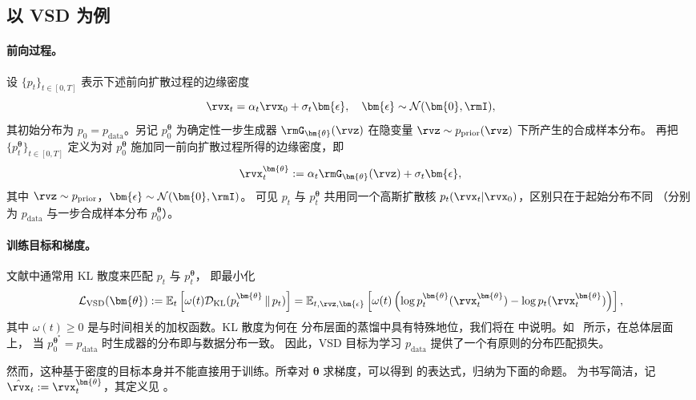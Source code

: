 \subsection{以 VSD 为例}
\paragraph{前向过程。}
设 $\{p_t\}_{t \in [0,T]}$ 表示下述前向扩散过程的边缘密度
\[
\rvx_t = \alpha_t \rvx_0 + \sigma_t \bm{\epsilon}, \quad \bm{\epsilon} \sim \mathcal{N}(\bm{0}, \rmI),
\]
其初始分布为 $p_0 = p_{\mathrm{data}}$。另记 $p_0^{\bm{\theta}}$ 为确定性一步生成器 $\rmG_{\bm{\theta}}(\rvz)$ 在隐变量
$\rvz \sim p_{\mathrm{prior}}(\rvz)$ 下所产生的合成样本分布。
再把 $\{p_t^{\bm{\theta}}\}_{t \in [0,T]}$ 定义为对 $p_0^{\bm{\theta}}$
施加同一前向扩散过程所得的边缘密度，即
\begin{align}\label{eq:vsd-forward}
    \rvx_t^{\bm{\theta}} := \alpha_t \rmG_{\bm{\theta}}(\rvz) + \sigma_t \bm{\epsilon},
\end{align}
其中 $\rvz \sim p_{\mathrm{prior}}$，$\bm{\epsilon} \sim \mathcal{N}(\bm{0}, \rmI)$。
可见 $p_t$ 与 $p_t^{\bm{\theta}}$ 共用同一个高斯扩散核
$p_t(\rvx_t| \rvx_0)$，区别只在于起始分布不同
（分别为 $p_{\mathrm{data}}$ 与一步合成样本分布 $p_0^{\bm{\theta}}$）。

\paragraph{训练目标和梯度。}
文献中通常用 KL 散度来匹配 $p_t$ 与 $p_t^{\bm{\theta}}$，
即最小化
\begin{align*}
    \mathcal{L}_{\text{VSD}}(\bm{\theta}) :=\mathbb{E}_t \left[ \omega(t)  \mathcal{D}_{\text{KL}}(p_t^{\bm{\theta}} \, \| \, p_t) \right]
= \mathbb{E}_{t, \rvz, \bm{\epsilon}} \left[ \omega(t) \left( \log p_t^{\bm{\theta}}(\rvx_t^{\bm{\theta}}) - \log p_t(\rvx_t^{\bm{\theta}}) \right) \right],
\end{align*}
其中 $\omega(t)\geq 0$ 是与时间相关的加权函数。KL 散度为何在
分布层面的蒸馏中具有特殊地位，我们将在 
中说明。如~\citet{wang2023prolificdreamer} 所示，在总体层面上，
当 $p_0^{\bm{\theta}^*}=p_{\mathrm{data}}$ 时生成器的分布即与数据分布一致。
因此，VSD 目标为学习 $p_{\mathrm{data}}$ 提供了一个有原则的分布匹配损失。

然而，这种基于密度的目标本身并不能直接用于训练。所幸对 $\bm{\theta}$
求梯度，可以得到  的表达式，归纳为下面的命题。
为书写简洁，记 $\hat\rvx_t := \rvx_t^{\bm{\theta}}$，其定义见
。


